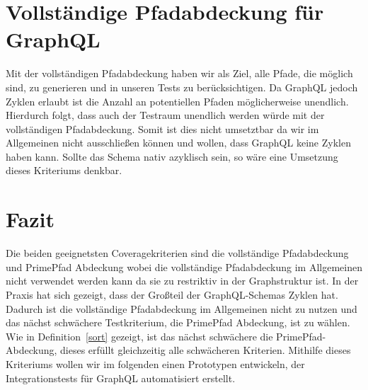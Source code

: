 \section{Vollständige Pfadabdeckung für GraphQL}

Mit der vollständigen Pfadabdeckung haben wir als Ziel, alle Pfade, die möglich sind, zu generieren und in unseren Tests zu berücksichtigen.
Da GraphQL jedoch Zyklen erlaubt ist die Anzahl an potentiellen Pfaden möglicherweise unendlich.
Hierdurch folgt, dass auch der Testraum unendlich werden würde mit der vollständigen Pfadabdeckung.
Somit ist dies nicht umsetztbar da wir im Allgemeinen nicht ausschließen können und wollen, dass GraphQL keine Zyklen haben kann.
Sollte das Schema nativ azyklisch sein, so wäre eine Umsetzung dieses Kriteriums denkbar.

\section{Fazit}

Die beiden geeignetsten Coveragekriterien sind die vollständige Pfadabdeckung und PrimePfad Abdeckung wobei die vollständige Pfadabdeckung im
Allgemeinen nicht verwendet werden kann da sie zu restriktiv in der Graphstruktur ist.
In der Praxis hat sich gezeigt, dass der Großteil der GraphQL-Schemas Zyklen hat.
Dadurch ist die vollständige Pfadabdeckung im Allgemeinen nicht zu nutzen und das nächst schwächere Testkriterium, die PrimePfad Abdeckung, ist zu wählen.
Wie in Definition~\ref{sort} gezeigt, ist das nächst schwächere die PrimePfad-Abdeckung, dieses erfüllt gleichzeitig alle schwächeren Kriterien.
Mithilfe dieses Kriteriums wollen wir im folgenden einen Prototypen entwickeln, der Integrationstests für GraphQL automatisiert erstellt.






